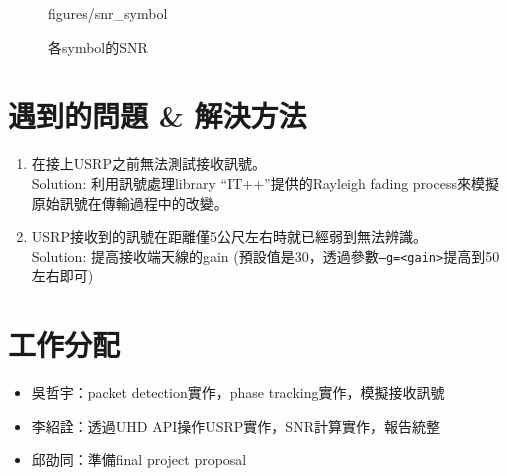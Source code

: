\documentclass[10pt,a4paper]{article}
\begin{document}
\begin{minipage}{\linewidth}
\begin{minipage}{0.45\linewidth}
\begin{figure}[H]
            {figures/snr_symbol}
            \caption{各symbol的SNR}
        \end{figure}
    \end{minipage}
\end{minipage}

\pagebreak

\section*{遇到的問題 \& 解決方法}
\begin{enumerate}
    \item 在接上USRP之前無法測試接收訊號。\\
    Solution: 利用訊號處理library ``IT++''提供的Rayleigh fading process來模擬原始訊號在傳輸過程中的改變。
    \item USRP接收到的訊號在距離僅5公尺左右時就已經弱到無法辨識。\\
    Solution: 提高接收端天線的gain (預設值是30，透過參數\texttt{--g=<gain>}提高到50左右即可)
\end{enumerate}

\section*{工作分配}
\begin{itemize}[leftmargin=!,itemindent=-4em]
    \item 吳哲宇：packet detection實作，phase tracking實作，模擬接收訊號
    \item 李紹詮：透過UHD API操作USRP實作，SNR計算實作，報告統整
    \item 邱劭同：準備final project proposal
\end{itemize}
\end{document}
